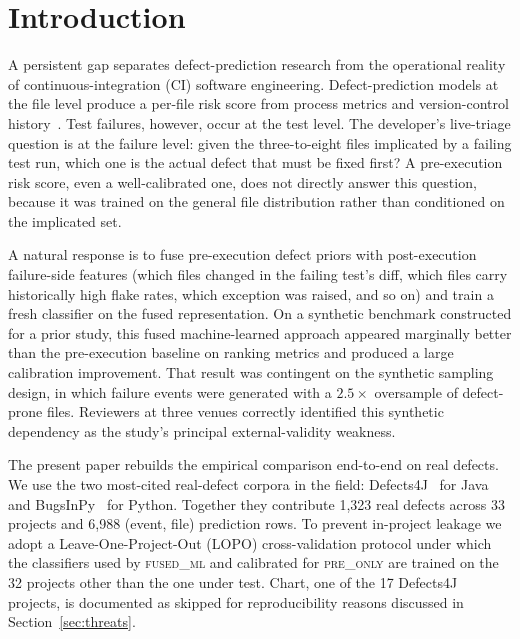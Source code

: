 \documentclass[preprint,12pt]{elsarticle}
\begin{document}
\section{Introduction}
\label{sec:intro}

A persistent gap separates defect-prediction research from the operational reality of continuous-integration (CI) software engineering. Defect-prediction models at the file level produce a per-file risk score from process metrics and version-control history~\cite{nagappan2005,moser2008,rahman2013,kamei2013}. Test failures, however, occur at the test level. The developer's live-triage question is at the failure level: given the three-to-eight files implicated by a failing test run, which one is the actual defect that must be fixed first? A pre-execution risk score, even a well-calibrated one, does not directly answer this question, because it was trained on the general file distribution rather than conditioned on the implicated set.

A natural response is to fuse pre-execution defect priors with post-execution failure-side features (which files changed in the failing test's diff, which files carry historically high flake rates, which exception was raised, and so on) and train a fresh classifier on the fused representation. On a synthetic benchmark constructed for a prior study, this fused machine-learned approach appeared marginally better than the pre-execution baseline on ranking metrics and produced a large calibration improvement. That result was contingent on the synthetic sampling design, in which failure events were generated with a $2.5\times$ oversample of defect-prone files. Reviewers at three venues correctly identified this synthetic dependency as the study's principal external-validity weakness.

The present paper rebuilds the empirical comparison end-to-end on real defects. We use the two most-cited real-defect corpora in the field: Defects4J~\cite{just2014defects4j} for Java and BugsInPy~\cite{widyasari2020bugsinpy} for Python. Together they contribute 1{,}323 real defects across 33 projects and 6{,}988 (event, file) prediction rows. To prevent in-project leakage we adopt a Leave-One-Project-Out (LOPO) cross-validation protocol under which the classifiers used by \textsc{fused\_ml} and calibrated for \textsc{pre\_only} are trained on the 32 projects other than the one under test. Chart, one of the 17 Defects4J projects, is documented as skipped for reproducibility reasons discussed in Section~\ref{sec:threats}.
\end{document}
